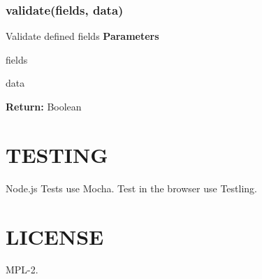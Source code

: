 \subsubsection*{{\ttfamily validate(fields, data)}}

Validate defined fields {\bfseries Parameters}
\begin{DoxyItemize}
\item {\ttfamily fields}
\item {\ttfamily data}
\end{DoxyItemize}

{\bfseries Return\+:} {\ttfamily Boolean}

\section*{T\+E\+S\+T\+I\+NG}

Node.\+js Tests use Mocha. Test in the browser use Testling.

\section*{L\+I\+C\+E\+N\+SE}

M\+P\+L-\/2. 